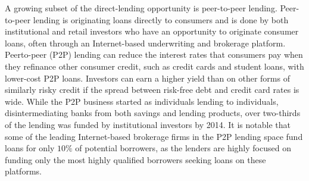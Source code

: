 \documentclass[11pt]{article}
\begin{document}
A growing subset of the direct-lending opportunity is peer-to-peer lending. Peer-to-peer lending is originating loans directly to consumers and is done by both institutional and retail investors who have an opportunity to originate consumer loans, often through an Internet-based underwriting and brokerage platform. Peerto-peer (P2P) lending can reduce the interest rates that consumers pay when they refinance other consumer credit, such as credit cards and student loans, with lower-cost P2P loans. Investors can earn a higher yield than on other forms of similarly risky credit if the spread between risk-free debt and credit card rates is wide. While the P2P business started as individuals lending to individuals, disintermediating banks from both savings and lending products, over two-thirds of the lending was funded by institutional investors by 2014. It is notable that some of the leading Internet-based brokerage firms in the P2P lending space fund loans for only $10 \%$ of potential borrowers, as the lenders are highly focused on funding only the most highly qualified borrowers seeking loans on these platforms.
\end{document}
